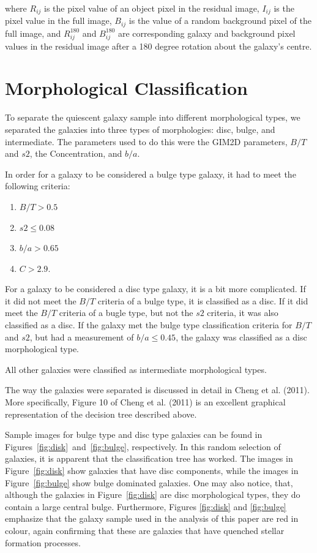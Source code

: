 \documentclass[showcase, preprintnumbers, amsmath, amssymb, bibnotes, 12pt]{revtex4}
\begin{document}
\noindent where $R_{ij}$ is the pixel value of an object pixel in the residual image, $I_{ij}$ is the pixel value in the full image, $B_{ij}$ is the value of a random background pixel of the full image, and $R_{ij}^{180}$ and $B_{ij}^{180}$ are corresponding galaxy and background pixel values in the residual image after a 180 degree rotation about the galaxy's centre.

\section{Morphological Classification}

To separate the quiescent galaxy sample into different morphological types, we separated the galaxies into three types of morphologies: disc, bulge, and intermediate. The parameters used to do this were the GIM2D parameters, $B/T$ and $s2$, the Concentration, and $b/a$.

In order for a galaxy to be considered a bulge type galaxy, it had to meet the following criteria:

\begin{enumerate}
\item $B/T > 0.5$
\item $s2 \leq 0.08$
\item $b/a > 0.65$
\item $C > 2.9$.
\end{enumerate}

For a galaxy to be considered a disc type galaxy, it is a bit more complicated. If it did not meet the $B/T$ criteria of a bulge type, it is classified as a disc. If it did meet the $B/T$ criteria of a bugle type, but not the $s2$ criteria, it was also classified as a disc. If the galaxy met the bulge type classification criteria for $B/T$ and $s2$, but had a measurement of $b/a \leq 0.45$, the galaxy was classified as a disc morphological type.

All other galaxies were classified as intermediate morphological types.

The way the galaxies were separated is discussed in detail in Cheng et al. (2011). More specifically, Figure 10 of Cheng et al. (2011) is an excellent graphical representation of the decision tree described above.

Sample images for bulge type and disc type galaxies can be found in Figures~\ref{fig:disk}~and~\ref{fig:bulge}, respectively. In this random selection of galaxies, it is apparent that the classification tree has worked. The images in Figure~\ref{fig:disk} show galaxies that have disc components, while the images in Figure~\ref{fig:bulge} show bulge dominated galaxies. One may also notice, that, although the galaxies in Figure~\ref{fig:disk} are disc morphological types, they do contain a large central bulge. Furthermore, Figures \ref{fig:disk} and \ref{fig:bulge} emphasize that the galaxy sample used in the analysis of this paper are red in colour, again confirming that these are galaxies that have quenched stellar formation processes.
\end{document}
